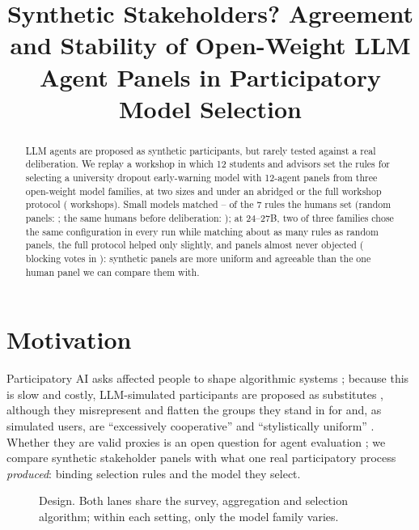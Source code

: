 \documentclass[11pt,a4paper]{article}
\title[Synthetic Stakeholders?]{Synthetic Stakeholders? Agreement and Stability of Open-Weight LLM Agent Panels in Participatory Model Selection}
\begin{document}
\maketitle

\begin{abstract}
LLM agents are proposed as synthetic participants, but rarely tested against a real deliberation.
We replay a workshop in which 12 students and advisors set the rules for selecting a university dropout early-warning model with 12-agent panels from three open-weight model families, at two sizes and under an abridged or the full workshop protocol (\nWorkshopsAll{} workshops).
Small models matched -- of the 7 rules the humans set (random panels: \chanceRules{}; the same humans before deliberation: \humanSelfRules{}); at 24--27B, two of three families chose the same configuration in every run while matching about as many rules as random panels, the full protocol helped only slightly, and panels almost never objected (\blockCardsAll{} blocking votes in \nCardsAll{}): synthetic panels are more uniform and agreeable than the one human panel we can compare them with.
\end{abstract}

\section{Motivation}
Participatory AI asks affected people to shape algorithmic systems \citep{birhanePowerPeopleOpportunities2022,delgadoParticipatoryTurnAI2023}; because this is slow and costly, LLM-simulated participants are proposed as substitutes \citep{argyle2023outofone,aher2023using}, although they misrepresent and flatten the groups they stand in for \citep{santurkar2023whose,wang2025misportray} and, as simulated users, are ``excessively cooperative'' and ``stylistically uniform'' \citep{zhou2026sim2real}.
Whether they are valid proxies is an open question for agent evaluation \citep{chen2026trends}; we compare synthetic stakeholder panels with what one real participatory process \emph{produced}: binding selection rules and the model they select.

\begin{figure}[b]
  \centering
  
  \caption{Design. Both lanes share the survey, aggregation and selection algorithm; within each setting, only the model family varies.}
  \label{fig:design}
\end{figure}
\end{document}
